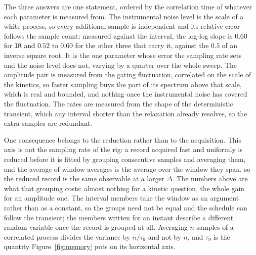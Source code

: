 The three answers are one statement, ordered by the correlation time of whatever each parameter is
measured from. The instrumental noise level is the scale of a white process, so every additional
sample is independent and its relative error follows the sample count: measured against the
interval, the log-log slope is $0.60$ for \texttt{IR} and $0.52$ to $0.60$ for the other three that
carry it, against the $0.5$ of an inverse square root. It is the one parameter whose error the
sampling rate sets and the noise level does not, varying by a quarter over the whole sweep. %
The amplitude pair is measured from the gating fluctuation, correlated on the scale of the kinetics,
so faster sampling buys the part of its spectrum above that scale, which is real and bounded, and
nothing once the instrumental noise has covered the fluctuation. The rates are measured from the
shape of the deterministic transient, which any interval shorter than the relaxation already
resolves, so the extra samples are redundant. 

One consequence belongs to the reduction rather than to the acquisition. This axis is not the
sampling rate of the rig: a record acquired fast and uniformly is reduced before it is fitted by
grouping consecutive samples and averaging them, and the average of window averages is the average
over the window they span, so the reduced record is the same observable at a larger $\Delta$. The
numbers above are what that grouping costs: almost nothing for a kinetic question, the whole gain
for an amplitude one. The interval members take the window as an argument rather than as a constant,
so the groups need not be equal and the schedule can follow the transient; the members written for
an instant describe a different random variable once the record is grouped at all.
Averaging $n$ samples of a correlated process divides the variance by $n/\tau_{9}$ and not by $n$, and $\tau_{9}$ is the quantity Figure~\ref{fig:memory} puts on its horizontal axis.


